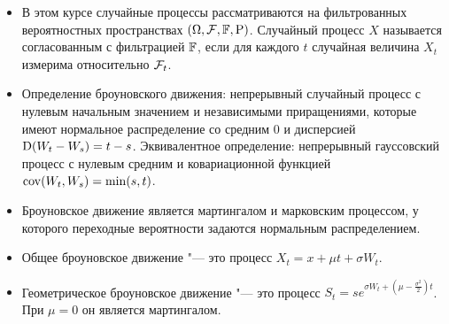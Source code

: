 \summary

\begin{itemize}
\item В этом курсе случайные процессы рассматриваются на фильтрованных вероятностных пространствах $(\Omega,\mathcal{F},\mathbb{F},\mathrm{P})$. Случайный процесс $
X$ называется согласованным с фильтрацией $\mathbb{F}$, если для каждого $t$ случайная величина $X_t$ измерима относительно $\mathcal{F}_t$.

\item Определение броуновского движения: непрерывный случайный процесс с нулевым начальным значением и независимыми приращениями, которые имеют нормальное распределение со средним 0 и дисперсией $\operatorname{D} (W_t-W_s) = t-s$. Эквивалентное определение: непрерывный гауссовский процесс с нулевым средним и ковариационной функцией $\operatorname{cov}(W_t,W_s) = \min(s,t)$.

\item Броуновское движение является мартингалом и марковским процессом, у которого переходные вероятности задаются нормальным распределением.

\item Общее броуновское движение "--- это процесс $X_t = x + \mu t + \sigma W_t$.

\item Геометрическое броуновское движение "--- это процесс $S_t = s e^{\sigma W_t + (\mu-\frac{\sigma^2}{2})t}$. При $\mu=0$ он является мартингалом.
\end{itemize}
